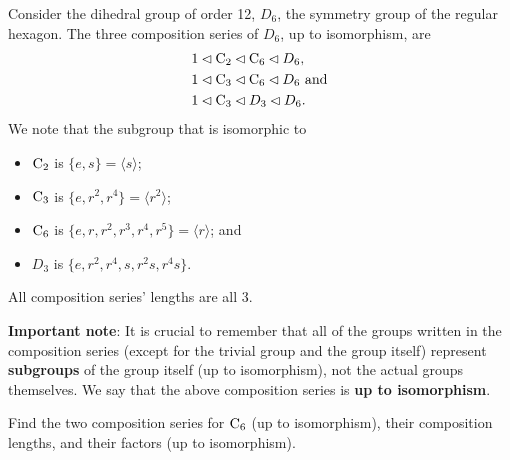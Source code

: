 \begin{example}
    Consider the dihedral group of order 12, $D_6$, the symmetry group of the regular hexagon. The three composition series of $D_6$, up to isomorphism, are
    \begin{align*}
        &1 \lhd \mathrm{C}_{2} \lhd \mathrm{C}_{6} \lhd D_6,\\
        &1 \lhd \mathrm{C}_{3} \lhd \mathrm{C}_{6} \lhd D_6 \text{ and}\\
        &1 \lhd \mathrm{C}_{3} \lhd D_3 \lhd D_6.
    \end{align*}
    We note that the subgroup that is isomorphic to
    \begin{itemize}
        \item $\mathrm{C}_{2}$ is $\{e, s\} = \langle s \rangle$;
        \item $\mathrm{C}_{3}$ is $\{e, r^2, r^4\} = \langle r^2\rangle$;
        \item $\mathrm{C}_{6}$ is $\{e, r, r^2, r^3, r^4, r^5\} = \langle r\rangle$; and
        \item $D_3$ is $\{e, r^2, r^4, s, r^2s, r^4s\}$.
    \end{itemize}
    All composition series' lengths are all 3.
\end{example}
\textbf{Important note}: It is crucial to remember that all of the groups written in the composition series (except for the trivial group and the group itself) represent \textbf{subgroups} of the group itself (up to isomorphism), not the actual groups themselves. We say that the above composition series is \textbf{up to isomorphism}.

\begin{exercise}
    Find the two composition series for $\mathrm{C}_{6}$ (up to isomorphism), their composition lengths, and their factors (up to isomorphism).
\end{exercise}

\newpage

